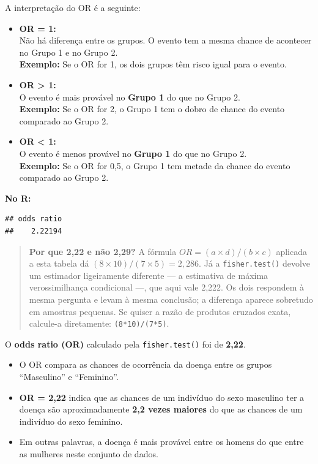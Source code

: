 \documentclass[
]{book}
\newenvironment{Shaded}{\begin{snugshade}}{\end{snugshade}}
\newcommand{\FunctionTok}[1]{\textcolor[rgb]{0.13,0.29,0.53}{\textbf{#1}}}
\newcommand{\NormalTok}[1]{#1}
\newcommand{\SpecialCharTok}[1]{\textcolor[rgb]{0.81,0.36,0.00}{\textbf{#1}}}
\begin{document}
A interpretação do OR é a seguinte:

\begin{itemize}
\item
  \textbf{OR = 1:}\\
  Não há diferença entre os grupos. O evento tem a mesma chance de acontecer no Grupo 1 e no Grupo 2.\\
  \textbf{Exemplo:} Se o OR for 1, os dois grupos têm risco igual para o evento.
\item
  \textbf{OR \textgreater{} 1:}\\
  O evento é mais provável no \textbf{Grupo 1} do que no Grupo 2.\\
  \textbf{Exemplo:} Se o OR for 2, o Grupo 1 tem o dobro de chance do evento comparado ao Grupo 2.
\item
  \textbf{OR \textless{} 1:}\\
  O evento é menos provável no \textbf{Grupo 1} do que no Grupo 2.\\
  \textbf{Exemplo:} Se o OR for 0,5, o Grupo 1 tem metade da chance do evento comparado ao Grupo 2.
\end{itemize}

\textbf{No R:}

\begin{Shaded}
\end{Shaded}

\begin{verbatim}
## odds ratio 
##    2.22194
\end{verbatim}

\begin{quote}
\textbf{Por que 2,22 e não 2,29?} A fórmula \(OR = (a \times d)/(b \times c)\) aplicada a esta tabela dá \((8 \times 10)/(7 \times 5) = 2{,}286\). Já a \texttt{fisher.test()} devolve um estimador ligeiramente diferente --- a estimativa de máxima verossimilhança condicional ---, que aqui vale 2,222. Os dois respondem à mesma pergunta e levam à mesma conclusão; a diferença aparece sobretudo em amostras pequenas. Se quiser a razão de produtos cruzados exata, calcule-a diretamente: \texttt{(8*10)/(7*5)}.
\end{quote}

O \textbf{odds ratio (OR)} calculado pela \texttt{fisher.test()} foi de \textbf{2,22}.

\begin{itemize}
\item
  O OR compara as chances de ocorrência da doença entre os grupos ``Masculino'' e ``Feminino''.
\item
  \textbf{OR = 2,22} indica que as chances de um indivíduo do sexo masculino ter a doença são aproximadamente \textbf{2,2 vezes maiores} do que as chances de um indivíduo do sexo feminino.
\item
  Em outras palavras, a doença é mais provável entre os homens do que entre as mulheres neste conjunto de dados.
\end{itemize}
\end{document}
